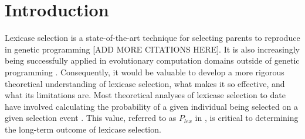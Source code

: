\documentclass[sigconf]{acmart}
\begin{document}



\maketitle

\section{Introduction}



Lexicase selection is a state-of-the-art technique for selecting parents to reproduce in genetic programming \citep{spector_assessment_2012} [ADD MORE CITATIONS HERE]. It is also increasingly being successfully applied in evolutionary computation domains outside of genetic programming \citep{metevier_lexicase_2019}. Consequently, it would be valuable to develop a more rigorous theoretical understanding of lexicase selection, what makes it so effective, and what its limitations are. Most theoretical analyses of lexicase selection to date have involved calculating the probability of a given individual being selected on a given selection event \citep{la_cava_probabilistic_2018, dolson_ecological_2018}. This value, referred to as $P_{lex}$ in \citep{la_cava_probabilistic_2018}, is critical to determining the long-term outcome of lexicase selection. 
\end{document}
